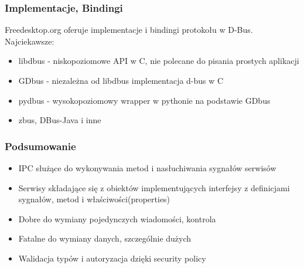 \begin{frame}
    \frametitle{Implementacje, Bindingi}
    Freedesktop.org oferuje implementacje i bindingi protokołu w D-Bus. Najciekawsze:
    \begin{itemize}
        \item libdbus - niskopoziomowe API w C, nie polecane do pisania 
        prostych aplikacji
        \item GDbus - niezależna od libdbus implementacja d-bus w C
        \item pydbus - wysokopoziomowy wrapper w pythonie na podstawie GDbus
        \item zbus, DBus-Java i inne
    \end{itemize}
\end{frame}


\begin{frame}
    \frametitle{Podsumowanie}
    \begin{itemize}
        \item IPC służące do wykonywania metod 
        i nasłuchiwania sygnałów serwisów
        \item Serwisy składające się z obiektów implementujących interfejsy
        z definicjami sygnałów, metod i właściwości(properties)
        \item Dobre do wymiany pojedynczych wiadomości, kontrola
        \item Fatalne do wymiany danych, szczególnie dużych
        \item Walidacja typów i autoryzacja dzięki security policy
    \end{itemize}
\end{frame}